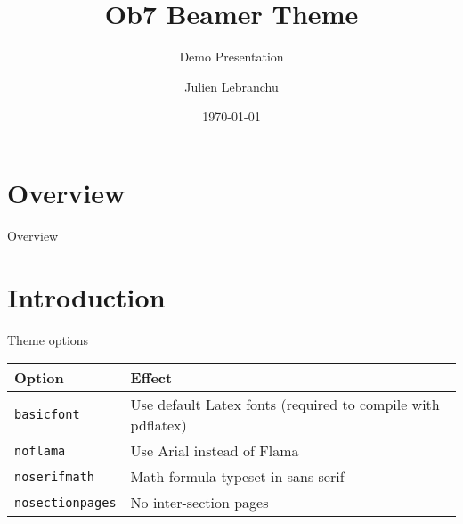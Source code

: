 \documentclass[compress,aspectratio=169]{beamer}
\title{Ob7 Beamer Theme}
\subtitle{Demo Presentation}
\date{\today}
\author{Julien Lebranchu}
\institute{OB7/UMR 248 MARBEC/{\bf IRD}}
\begin{document}

\maketitle


\section*{Overview}
\begin{frame}{Overview}
    \tableofcontents[hideallsubsections]
\end{frame}

\section{Introduction}

\begin{frame}{Theme options}
    \begin{table}[]
        \begin{tabularx}{\linewidth}{l>{\raggedright}X}
            \toprule
            \textbf{Option}			& \textbf{Effect} \tabularnewline
            \midrule
            \texttt{basicfont}		& Use default Latex fonts (required to compile
            with pdflatex) \tabularnewline
            \texttt{noflama}		& Use Arial instead of Flama \tabularnewline
            \texttt{noserifmath}		& Math formula typeset in sans-serif \tabularnewline
            \texttt{nosectionpages} & No inter-section pages \tabularnewline
            \bottomrule
        \end{tabularx}
        \label{tab:options}
    \end{table}
\end{frame}
\end{document}
